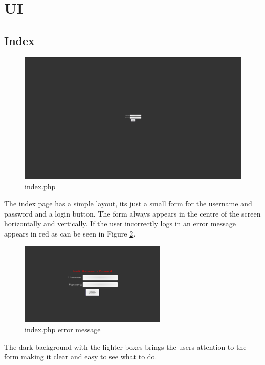 \documentclass[12pt,a4paper]{report}
\begin{document}
	\section{UI}
	\subsection{Index}
	\begin{figure}[!ht]
		\hspace*{-1in}
		\centering
		\includegraphics[width=170mm]{img/index.png}
		\caption{index.php \label{index.php}}
	\end{figure}	
	The index page has a simple layout, its just a small form for the username and password and a login button. The form always appears in the centre of the screen horizontally and vertically. If the user incorrectly logs in an error message appears in red as can be seen in Figure \ref{indexerror.php}.
	\begin{figure}[H]
		\centering
		\includegraphics[width=70mm]{img/indexerror.png}
		\caption{index.php error message \label{indexerror.php}}
	\end{figure}
	The dark background with the lighter boxes brings the users attention to the form making it clear and easy to see what to do.
\end{document}
